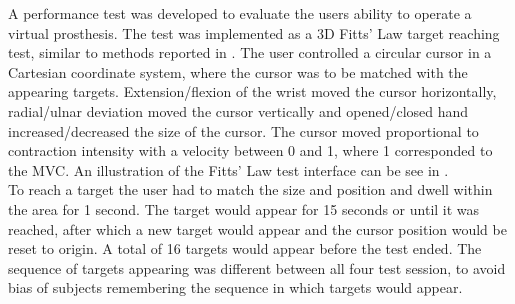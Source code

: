 A performance test was developed to evaluate the users ability to operate a virtual prosthesis. The test was implemented as a 3D Fitts' Law target reaching test, similar to methods reported in \cite{Scheme2013, Scheme2013a}. The user controlled a circular cursor in a Cartesian coordinate system, where the cursor was to be matched with the appearing targets. Extension/flexion of the wrist moved the cursor horizontally, radial/ulnar deviation moved the cursor vertically and opened/closed hand increased/decreased the size of the cursor. The cursor moved proportional to contraction intensity with a velocity between 0 and 1, where 1 corresponded to the MVC. An illustration of the Fitts' Law test interface can be see in . \\
To reach a target the user had to match the size and position and dwell within the area for 1 second. The target would appear for 15 seconds or until it was reached, after which a new target would appear and the cursor position would be reset to origin. A total of 16 targets would appear before the test ended. The sequence of targets appearing was different between all four test session, to avoid bias of subjects remembering the sequence in which targets would appear. \\


